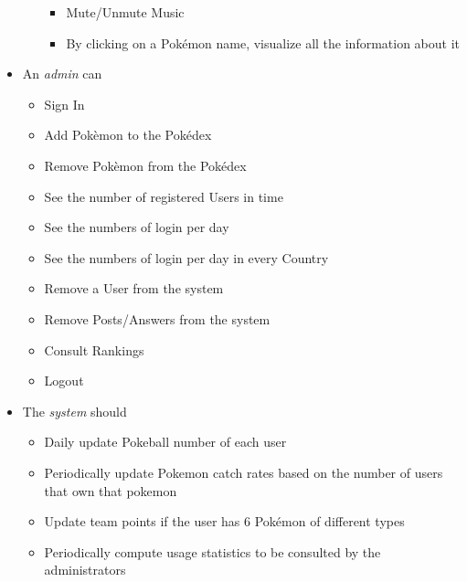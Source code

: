 \begin{itemize}
\begin{itemize}
\begin{itemize}
			\item Mute/Unmute Music
			\item \colorbox{BurntOrange}{By clicking on a Pokémon name, visualize all the information about it} 
		\end{itemize}
	\end{itemize}
	\item An \textit{admin} can
	\begin{itemize}
		\item Sign In
		\item Add Pokèmon to the Pokédex
		\item Remove Pokèmon from the Pokédex
		\item See the number of registered Users in time
		\item See the numbers of login per day
		\item See the numbers of login per day in every Country
		\item Remove a User from the system
		\item Remove Posts/Answers from the system
		\item Consult Rankings
		\item Logout
\end{itemize}
	\item The \textit{system} should
	\begin{itemize}
		\item Daily update Pokeball number of each user
		\item Periodically update Pokemon catch rates based on the number of users that own that pokemon
		\item Update team points if the user has 6 Pokémon of different types
		\item Periodically compute usage statistics to be consulted by the administrators
	\end{itemize}
\end{itemize}

